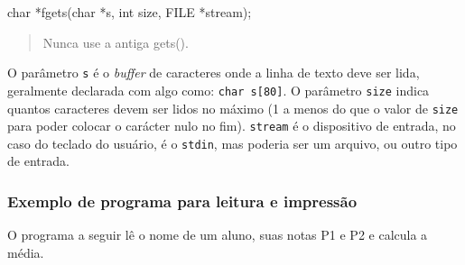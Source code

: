 \documentclass[
]{article}
\newenvironment{Shaded}{}{}
\newcommand{\DataTypeTok}[1]{\textcolor[rgb]{0.56,0.13,0.00}{#1}}
\newcommand{\DecValTok}[1]{\textcolor[rgb]{0.25,0.63,0.44}{#1}}
\newcommand{\ImportTok}[1]{#1}
\newcommand{\NormalTok}[1]{#1}
\newcommand{\PreprocessorTok}[1]{\textcolor[rgb]{0.74,0.48,0.00}{#1}}
\newcommand{\SpecialCharTok}[1]{\textcolor[rgb]{0.25,0.44,0.63}{#1}}
\newcommand{\StringTok}[1]{\textcolor[rgb]{0.25,0.44,0.63}{#1}}
\begin{document}
\begin{Shaded}
\begin{Highlighting}[]
\DataTypeTok{char}\NormalTok{ *fgets(}\DataTypeTok{char}\NormalTok{ *s, }\DataTypeTok{int}\NormalTok{ size, }\DataTypeTok{FILE}\NormalTok{ *stream);}
\end{Highlighting}
\end{Shaded}

\begin{quote}
Nunca use a antiga gets().
\end{quote}

O parâmetro \texttt{s} é o \emph{buffer} de caracteres onde a linha de
texto deve ser lida, geralmente declarada com algo como:
\texttt{char\ s{[}80{]}}. O parâmetro \texttt{size} indica quantos
caracteres devem ser lidos no máximo (1 a menos do que o valor de
\texttt{size} para poder colocar o carácter nulo no fim).
\texttt{stream} é o dispositivo de entrada, no caso do teclado do
usuário, é o \texttt{stdin}, mas poderia ser um arquivo, ou outro tipo
de entrada.

\hypertarget{exemplo-de-programa-para-leitura-e-impressuxe3o}{%
\subsubsection{Exemplo de programa para leitura e
impressão}\label{exemplo-de-programa-para-leitura-e-impressuxe3o}}

O programa a seguir lê o nome de um aluno, suas notas P1 e P2 e calcula
a média.

\begin{Shaded}
\end{Shaded}
\end{document}

